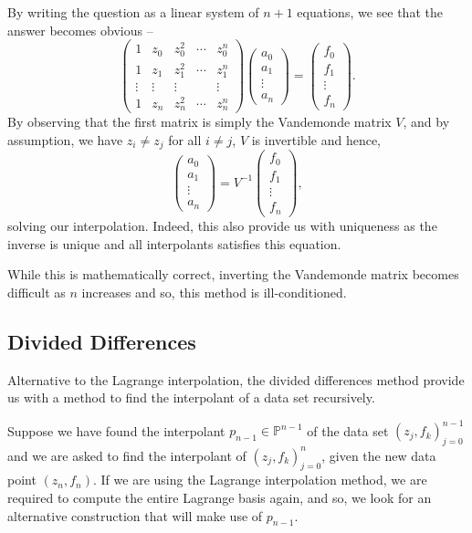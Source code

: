 \documentclass[
]{article}
\theoremstyle{definition}
\theoremstyle{definition}
\begin{document}
By writing the question as a linear system of \(n + 1\) equations, we
see that the answer becomes obvious -- \[\begin{pmatrix}
  1 & z_0 & z_0^2 & \cdots & z_0^n\\
  1 & z_1 & z_1^2 & \cdots & z_1^n\\
  \vdots & \vdots & \vdots & & \vdots\\
  1 & z_n & z_n^2 & \cdots & z_n^n
\end{pmatrix}
\begin{pmatrix}
  a_0 \\ a_1 \\ \vdots \\ a_n
\end{pmatrix}
= 
\begin{pmatrix}
  f_0 \\ f_1 \\ \vdots \\ f_n
\end{pmatrix}.\] By observing that the first matrix is simply the
Vandemonde matrix \(V\), and by assumption, we have \(z_i \neq z_j\) for
all \(i \neq j\), \(V\) is invertible and hence, \[\begin{pmatrix}
  a_0 \\ a_1 \\ \vdots \\ a_n
\end{pmatrix} = V^{-1}
\begin{pmatrix}
  f_0 \\ f_1 \\ \vdots \\ f_n
\end{pmatrix},\] solving our interpolation. Indeed, this also provide us
with uniqueness as the inverse is unique and all interpolants satisfies
this equation.

While this is mathematically correct, inverting the Vandemonde matrix
becomes difficult as \(n\) increases and so, this method is
ill-conditioned.

\hypertarget{divided-differences}{%
\subsection{Divided Differences}\label{divided-differences}}

Alternative to the Lagrange interpolation, the divided differences
method provide us with a method to find the interpolant of a data set
recursively.

Suppose we have found the interpolant
\(p_{n - 1} \in \mathbb{P}^{n - 1}\) of the data set
\((z_j, f_k)_{j = 0}^{n - 1}\) and we are asked to find the interpolant
of \((z_j, f_k)_{j = 0}^n\), given the new data point \((z_n, f_n)\). If
we are using the Lagrange interpolation method, we are required to
compute the entire Lagrange basis again, and so, we look for an
alternative construction that will make use of \(p_{n - 1}\).
\end{document}
